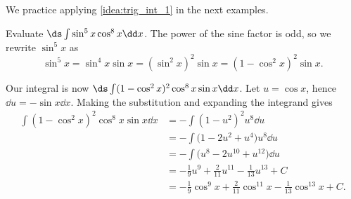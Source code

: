 We practice applying \autoref{idea:trig_int_1} in the next examples.

\begin{example}\label{ex_trigint1}
Evaluate $\ds\int\sin^5x\cos^8x\dd x$.
\solution
The power of the sine factor is odd, so we rewrite $\sin^5x$ as
\[\sin^5x = \sin^4x\sin x = (\sin^2x)^2\sin x = (1-\cos^2x)^2\sin x.\]

Our integral is now $\ds \int (1-\cos^2x)^2\cos^8x\sin x\dd x$. Let $u = \cos x$, hence $\dd u = -\sin x\dd x$. Making the substitution and expanding the integrand gives
\begin{align*}
 \int (1-\cos^2x)^2\cos^8x\sin x\dd x
 &= -\int (1-u^2)^2u^8\dd u \\
 &= -\int \bigl(1-2u^2+u^4\bigr)u^8\dd u \\
 &= -\int \bigl(u^8-2u^{10}+u^{12}\bigr)\dd u \\
 &= -\frac19u^9 + \frac2{11}u^{11} - \frac1{13}u^{13} + C \\
 &=-\frac19\cos^9 x + \frac2{11}\cos^{11} x - \frac1{13}\cos^{13} x + C.
\end{align*}
\end{example}

